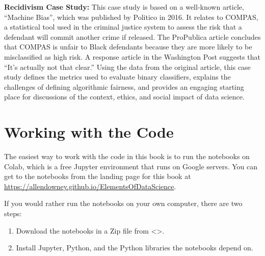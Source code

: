 \textbf{Recidivism Case Study:} This case study is based on a well-known
article, ``Machine Bias'', which was published by Politico in 2016. It
relates to COMPAS, a statistical tool used in the criminal justice
system to assess the risk that a defendant will commit another crime if
released. The ProPublica article concludes that COMPAS is unfair to
Black defendants because they are more likely to be misclassified as
high risk. A response article in the Washington Post suggests that
``It's actually not that clear.'' Using the data from the original
article, this case study defines the metrics used to evaluate binary
classifiers, explains the challenges of defining algorithmic fairness,
and provides an engaging starting place for discussions of the context,
ethics, and social impact of data science.

\hypertarget{working-with-the-code}{%
\section{Working with the Code}\label{working-with-the-code}}

The easiest way to work with the code in this book is to run the
notebooks on Colab, which is a free Jupyter environment that runs on
Google servers. You can get to the notebooks from the landing page for
this book at \url{https://allendowney.github.io/ElementsOfDataScience}.

If you would rather run the notebooks on your own computer, there are
two steps:

\begin{enumerate}
\def\labelenumi{\arabic{enumi}.}
\item
  Download the notebooks in a Zip file from \textless\textgreater.
\item
  Install Jupyter, Python, and the Python libraries the notebooks depend
  on.
\end{enumerate}

